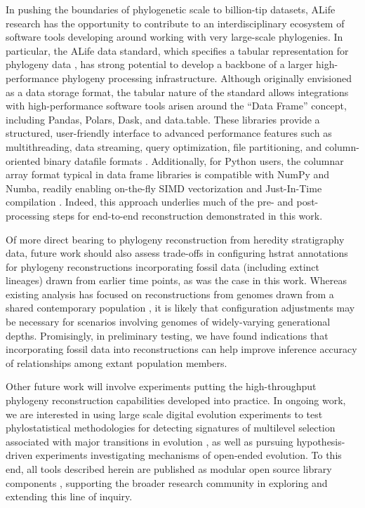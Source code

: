 In pushing the boundaries of phylogenetic scale to billion-tip datasets, ALife research has the opportunity to contribute to an interdisciplinary ecosystem of software tools developing around working with very large-scale phylogenies.
In particular, the ALife data standard, which specifies a tabular representation for phylogeny data \citep{Lalejini2019data}, has strong potential to develop a backbone of a larger high-performance phylogeny processing infrastructure.
Although originally envisioned as a data storage format, the tabular nature of the standard allows integrations with high-performance software tools arisen around the ``Data Frame'' concept, including Pandas, Polars, Dask, and data.table.
These libraries provide a structured, user-friendly interface to advanced performance features such as multithreading, data streaming, query optimization, file partitioning, and column-oriented binary datafile formats \citep{mckinney2010data,datatable,vink2024polars,rocklin2015dask}.
Additionally, for Python users, the columnar array format typical in data frame libraries is compatible with NumPy and Numba, readily enabling on-the-fly SIMD vectorization and Just-In-Time compilation \citep{harris2020array,lam2015numba}.
Indeed, this approach underlies much of the pre- and post-processing steps for end-to-end reconstruction demonstrated in this work.

Of more direct bearing to phylogeny reconstruction from heredity stratigraphy data, future work should also assess trade-offs in configuring hstrat annotations for phylogeny reconstructions incorporating fossil data (including extinct lineages) drawn from earlier time points, as was the case in this work.
Whereas existing analysis has focused on reconstructions from genomes drawn from a shared contemporary population \citep{moreno2025testing}, it is likely that configuration adjustments may be necessary for scenarios involving genomes of widely-varying generational depths.
Promisingly, in preliminary testing, we have found indications that incorporating fossil data into reconstructions can help improve inference accuracy of relationships among extant population members.

Other future work will involve experiments putting the high-throughput phylogeny reconstruction capabilities developed into practice.
In ongoing work, we are interested in using large scale digital evolution experiments to test phylostatistical methodologies for detecting signatures of multilevel selection associated with major transitions in evolution \citep{BonettiFranceschi2024}, as well as pursuing hypothesis-driven experiments investigating mechanisms of open-ended evolution.
To this end, all tools described herein are published as modular open source library components \citep{moreno2024hstrat}, supporting the broader research community in exploring and extending this line of inquiry.
